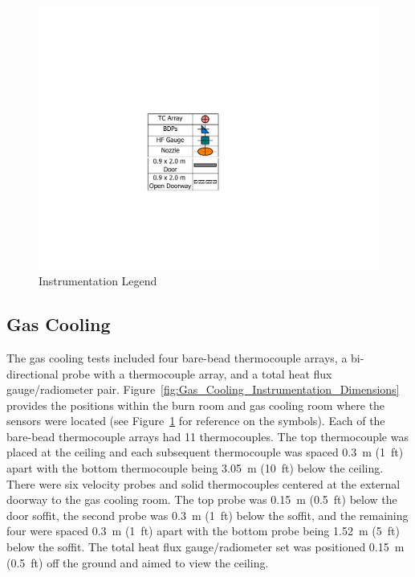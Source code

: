 \documentclass[12pt,oneside]{book}
\begin{document}
\begin{figure}[!ht]
	\includegraphics[width=.35\columnwidth]{../Figures/Floor_Plans/PDFs/DelCo_2012_Instrumentation_Legend}
	\caption{Instrumentation Legend}
	\label{fig:Instrumentation_Legend}
\end{figure}

\subsection{Gas Cooling}
\label{subsec:Gas_Cooling_Instrumentation}

The gas cooling tests included four bare-bead thermocouple arrays, a bi-directional probe with a thermocouple array, and a total heat flux gauge/radiometer pair. Figure~\ref{fig:Gas_Cooling_Instrumentation_Dimensions} provides the positions within the burn room and gas cooling room where the sensors were located (see Figure~\ref{fig:Instrumentation_Legend} for reference on the symbols). Each of the bare-bead thermocouple arrays had 11 thermocouples. The top thermocouple was placed at the ceiling and each subsequent thermocouple was spaced 0.3~m (1~ft) apart with the bottom thermocouple being 3.05~m (10~ft) below the ceiling. There were six velocity probes and solid thermocouples centered at the external doorway to the gas cooling room. The top probe was 0.15~m (0.5~ft) below the door soffit, the second probe was 0.3~m (1~ft) below the soffit, and the remaining four were spaced 0.3~m (1~ft) apart with the bottom probe being 1.52~m (5~ft) below the soffit. The total heat flux gauge/radiometer set was positioned 0.15~m (0.5~ft) off the ground and aimed to view the ceiling.
\end{document}

